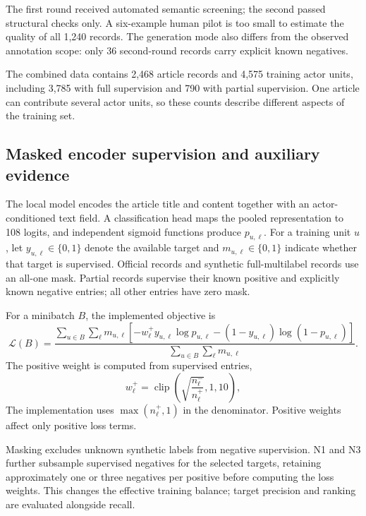 \documentclass[12pt,a4paper]{article}
\begin{document}
The first round received automated semantic screening; the second passed structural checks only. A six-example human pilot is too small to estimate the quality of all 1,240 records. The generation mode also differs from the observed annotation scope: only 36 second-round records carry explicit known negatives.

The combined data contains 2,468 article records and 4,575 training actor units, including 3,785 with full supervision and 790 with partial supervision. One article can contribute several actor units, so these counts describe different aspects of the training set.

\subsection{Masked encoder supervision and auxiliary evidence}
The local model encodes the article title and content together with an actor-conditioned text field. A classification head maps the pooled representation to 108 logits, and independent sigmoid functions produce $p_{u,\ell}$. For a training unit $u$, let $y_{u,\ell}\in\{0,1\}$ denote the available target and $m_{u,\ell}\in\{0,1\}$ indicate whether that target is supervised. Official records and synthetic full-multilabel records use an all-one mask. Partial records supervise their known positive and explicitly known negative entries; all other entries have zero mask.

For a minibatch $B$, the implemented objective is
\begin{equation}
\mathcal{L}(B)=\frac{\sum_{u\in B}\sum_{\ell}m_{u,\ell}
\left[-w^+_\ell y_{u,\ell}\log p_{u,\ell}
-(1-y_{u,\ell})\log(1-p_{u,\ell})\right]}
{\sum_{u\in B}\sum_{\ell}m_{u,\ell}}.
\label{eq:maskedloss}
\end{equation}
The positive weight is computed from supervised entries,
\begin{equation}
w^+_\ell=\operatorname{clip}\!\left(\sqrt{\frac{n^-_\ell}{n^+_\ell}},1,10\right),
\label{eq:weights}
\end{equation}
The implementation uses $\max(n^+_\ell,1)$ in the denominator. Positive weights affect only positive loss terms.

Masking excludes unknown synthetic labels from negative supervision. N1 and N3 further subsample supervised negatives for the selected targets, retaining approximately one or three negatives per positive before computing the loss weights. This changes the effective training balance; target precision and ranking are evaluated alongside recall.
\end{document}
